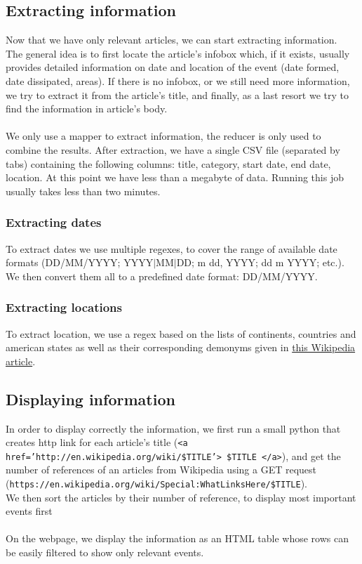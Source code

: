 \subsection{Extracting information}
Now that we have only relevant articles, we can start extracting information. \\
The general idea is to first locate the article's infobox which, if it exists, usually provides detailed information on date and location of the event (date formed, date dissipated, areas). If there is no infobox, or we still need more information, we try to extract it from the article's title, and finally, as a last resort we try to find the information in article's body.\\\\
We only use a mapper to extract information, the reducer is only used to combine the results.
After extraction, we have a single CSV file (separated by tabs) containing the following columns: title, category, start date, end date, location. At this point we have less than a megabyte of data. Running this job usually takes less than two minutes.
\subsubsection{Extracting dates}
To extract dates we use multiple regexes, to cover the range of available date formats (DD/MM/YYYY; YYYY$|$MM$|$DD; m dd, YYYY; dd m YYYY; etc.). We then convert them all to a predefined date format: DD/MM/YYYY. 
\subsubsection{Extracting locations}
To extract location, we use a regex based on the lists of continents, countries and american states as well as their corresponding demonyms given in \href{http://en.wikipedia.org/wiki/List_of_adjectival_forms_of_place_names}{this Wikipedia article}.
\subsection{Displaying information}
In order to display correctly the information, we first run a small python that creates http link for each article's title (\texttt{<a href='http://en.wikipedia.org/wiki/\$TITLE'> \$TITLE </a>}), and get the number of references of an articles from Wikipedia using a GET request (\texttt{https://en.wikipedia.org/wiki/Special:WhatLinksHere/\$TITLE}).\\
We then sort the articles by their number of reference, to display most important events first\\\\
On the webpage, we display the information as an HTML table whose rows can be easily filtered to show only relevant events.

